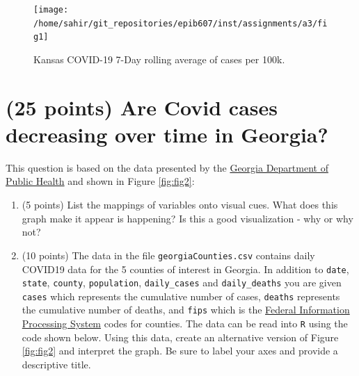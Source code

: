 \documentclass[letterpaper,12pt,twoside,]{pinp}
\providecommand{\tightlist}{%
  \setlength{\itemsep}{0pt}\setlength{\parskip}{0pt}}
\begin{document}
\begin{figure}[H]

{\centering \texttt{[image: /home/sahir/git\_repositories/epib607/inst/assignments/a3/fig1]} 

}

\caption{Kansas COVID-19 7-Day rolling average of cases per 100k.}\label{fig:fig1}
\end{figure}

\newpage

\hypertarget{points-are-covid-cases-decreasing-over-time-in-georgia}{%
\section{(25 points) Are Covid cases decreasing over time in
Georgia?}\label{points-are-covid-cases-decreasing-over-time-in-georgia}}

This question is based on the data presented by the
\href{https://www.ajc.com/news/state--regional-govt--politics/just-cuckoo-state-latest-data-mishap-causes-critics-cry-foul/182PpUvUX9XEF8vO11NVGO/}{Georgia
Department of Public Health} and shown in Figure \ref{fig:fig2}:

\begin{enumerate}
\def\labelenumi{\alph{enumi})}
\tightlist
\item
  (5 points) List the mappings of variables onto visual cues. What does
  this graph make it appear is happening? Is this a good visualization -
  why or why not?\\
\item
  (10 points) The data in the file \texttt{georgiaCounties.csv} contains
  daily COVID19 data for the 5 counties of interest in Georgia. In
  addition to \texttt{date}, \texttt{state}, \texttt{county},
  \texttt{population}, \texttt{daily\_cases} and \texttt{daily\_deaths}
  you are given \texttt{cases} which represents the cumulative number of
  cases, \texttt{deaths} represents the cumulative number of deaths, and
  \texttt{fips} which is the
  \href{https://transition.fcc.gov/oet/info/maps/census/fips/fips.txt}{Federal
  Information Processing System} codes for counties. The data can be
  read into \texttt{R} using the code shown below. Using this data,
  create an alternative version of Figure \ref{fig:fig2} and interpret
  the graph. Be sure to label your axes and provide a descriptive title.
\end{enumerate}

\begin{Shaded}
\begin{Highlighting}[]
\OtherTok{\textless{}{-}}\SpecialCharTok{::}\SpecialCharTok{::}\NormalTok{(}\NormalTok{),}
                            \NormalTok{(}\NormalTok{))}
\end{Highlighting}
\end{Shaded}
\end{document}

